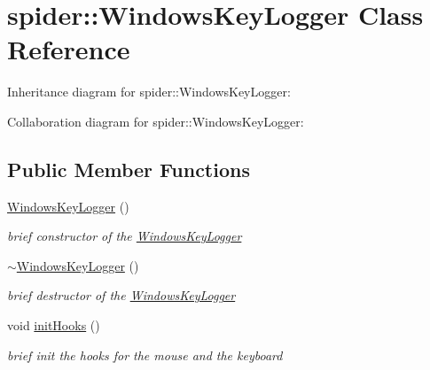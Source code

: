 \hypertarget{classspider_1_1_windows_key_logger}{}\section{spider\+:\+:Windows\+Key\+Logger Class Reference}
\label{classspider_1_1_windows_key_logger}


Inheritance diagram for spider\+:\+:Windows\+Key\+Logger\+:


Collaboration diagram for spider\+:\+:Windows\+Key\+Logger\+:
\subsection*{Public Member Functions}
\begin{DoxyCompactItemize}
\item 
\mbox{\label{classspider_1_1_windows_key_logger_a02df9214db3f0587ffd910fee6b0d8a2}} 
\hyperlink{classspider_1_1_windows_key_logger_a02df9214db3f0587ffd910fee6b0d8a2}{Windows\+Key\+Logger} ()
\begin{DoxyCompactList}\small\item\em brief constructor of the \hyperlink{classspider_1_1_windows_key_logger}{Windows\+Key\+Logger} \end{DoxyCompactList}\item 
\mbox{\label{classspider_1_1_windows_key_logger_a2a7bcba99ab1361bab9a9534b7dcfa92}} 
\hyperlink{classspider_1_1_windows_key_logger_a2a7bcba99ab1361bab9a9534b7dcfa92}{$\sim$\+Windows\+Key\+Logger} ()
\begin{DoxyCompactList}\small\item\em brief destructor of the \hyperlink{classspider_1_1_windows_key_logger}{Windows\+Key\+Logger} \end{DoxyCompactList}\item 
\mbox{\label{classspider_1_1_windows_key_logger_ad903bd2e95f79908b02fa83389bb4b9d}} 
void \hyperlink{classspider_1_1_windows_key_logger_ad903bd2e95f79908b02fa83389bb4b9d}{init\+Hooks} ()
\begin{DoxyCompactList}\small\item\em brief init the hooks for the mouse and the keyboard \end{DoxyCompactList}\item 

\end{DoxyCompactItemize}
